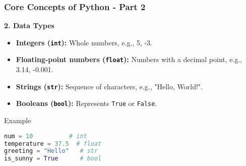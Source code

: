\documentclass{beamer}
\begin{document}
\begin{frame}[fragile]
    \frametitle{Core Concepts of Python - Part 2}
    \textbf{2. Data Types}
    \begin{itemize}
        \item \textbf{Integers (\texttt{int}):} Whole numbers, e.g., 5, -3.
        \item \textbf{Floating-point numbers (\texttt{float}):} Numbers with a decimal point, e.g., 3.14, -0.001.
        \item \textbf{Strings (\texttt{str}):} Sequence of characters, e.g., "Hello, World!".
        \item \textbf{Booleans (\texttt{bool}):} Represents \texttt{True} or \texttt{False}.
    \end{itemize}
    
    \begin{block}{Example}
    \begin{lstlisting}[language=Python]
num = 10          # int
temperature = 37.5  # float
greeting = "Hello"   # str
is_sunny = True      # bool
    \end{lstlisting}
    \end{block}
\end{frame}
\end{document}
